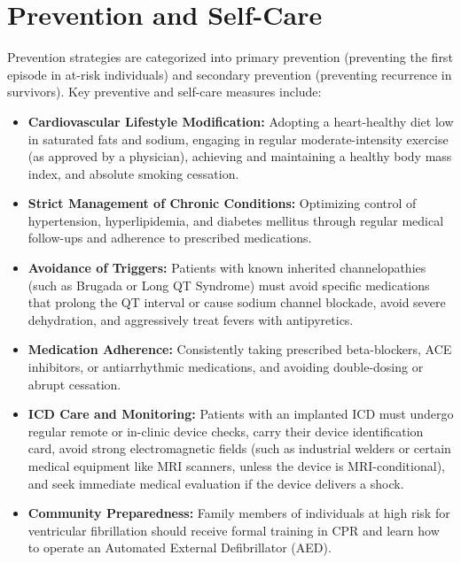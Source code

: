 \section*{Prevention and Self-Care}
Prevention strategies are categorized into primary prevention (preventing the first episode in at-risk individuals) and secondary prevention (preventing recurrence in survivors).
Key preventive and self-care measures include:
\begin{itemize}
    \item \textbf{Cardiovascular Lifestyle Modification:} Adopting a heart-healthy diet low in saturated fats and sodium, engaging in regular moderate-intensity exercise (as approved by a physician), achieving and maintaining a healthy body mass index, and absolute smoking cessation.
    \item \textbf{Strict Management of Chronic Conditions:} Optimizing control of hypertension, hyperlipidemia, and diabetes mellitus through regular medical follow-ups and adherence to prescribed medications.
    \item \textbf{Avoidance of Triggers:} Patients with known inherited channelopathies (such as Brugada or Long QT Syndrome) must avoid specific medications that prolong the QT interval or cause sodium channel blockade, avoid severe dehydration, and aggressively treat fevers with antipyretics.
    \item \textbf{Medication Adherence:} Consistently taking prescribed beta-blockers, ACE inhibitors, or antiarrhythmic medications, and avoiding double-dosing or abrupt cessation.
    \item \textbf{ICD Care and Monitoring:} Patients with an implanted ICD must undergo regular remote or in-clinic device checks, carry their device identification card, avoid strong electromagnetic fields (such as industrial welders or certain medical equipment like MRI scanners, unless the device is MRI-conditional), and seek immediate medical evaluation if the device delivers a shock.
    \item \textbf{Community Preparedness:} Family members of individuals at high risk for ventricular fibrillation should receive formal training in CPR and learn how to operate an Automated External Defibrillator (AED).
\end{itemize}

